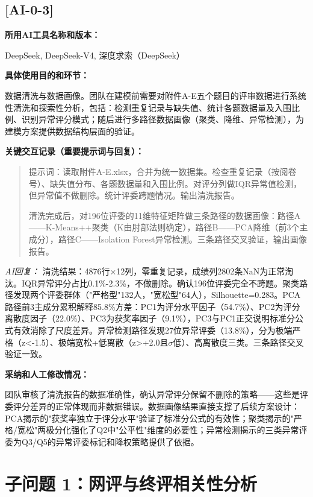 \documentclass[12pt,a4paper]{ctexart}
\begin{document}
\subsection*{[AI-0-3]}

\textbf{所用AI工具名称和版本：}\par
DeepSeek, DeepSeek-V4, 深度求索（DeepSeek）

\textbf{具体使用目的和环节：}\par
数据清洗与数据画像。团队在建模前需要对附件A-E五个题目的评审数据进行系统性清洗和探索性分析，包括：检测重复记录与缺失值、统计各题数据量及入围比例、识别异常评分模式；随后进行多路径数据画像（聚类、降维、异常检测），为建模方案提供数据结构层面的验证。

\textbf{关键交互记录（重要提示词与回复）：}\par

\begin{quote}
提示词：读取附件A-E.xlsx，合并为统一数据集。检查重复记录（按阅卷号）、缺失值分布、各题数据量和入围比例。对评分列做IQR异常值检测，但异常值不做删除。统计评委跨题情况。输出清洗报告。

清洗完成后，对196位评委的11维特征矩阵做三条路径的数据画像：路径A——K-Means++聚类（K由肘部法则确定），路径B——PCA降维（前3个主成分），路径C——Isolation Forest异常检测。三条路径交叉验证，输出画像报告。
\end{quote}

\textit{AI回复：} 清洗结果：4876行×12列，零重复记录，成绩列2802条NaN为正常淘汰。IQR异常评分占比0.1\%-2.3\%，不做删除。确认196位评委完全不跨题。聚类路径发现两个评委群体（"严格型"132人，"宽松型"64人），Silhouette=0.283。PCA路径前3主成分累积解释85.8\%方差：PC1为评分水平因子（54.7\%）、PC2为评分离散度因子（22.0\%）、PC3为获奖率因子（9.1\%），PC3与PC1正交说明标准分公式有效消除了尺度差异。异常检测路径发现27位异常评委（13.8\%），分为极端严格（z<-1.5）、极端宽松+低离散（z>+2.0且$\sigma$低）、高离散度三类。三条路径交叉验证一致。

\textbf{采纳和人工修改情况：}\par
团队审核了清洗报告的数据准确性，确认异常评分保留不删除的策略——这些是评委评分差异的正常体现而非数据错误。数据画像结果直接支撑了后续方案设计：PCA揭示的"获奖率独立于评分水平"验证了标准分公式的有效性；聚类揭示的"严格/宽松"两极分化强化了Q2中"公平性"维度的必要性；异常检测揭示的三类异常评委为Q3/Q5的异常评委标记和降权策略提供了依据。

\section*{子问题 1：网评与终评相关性分析}
\end{document}
